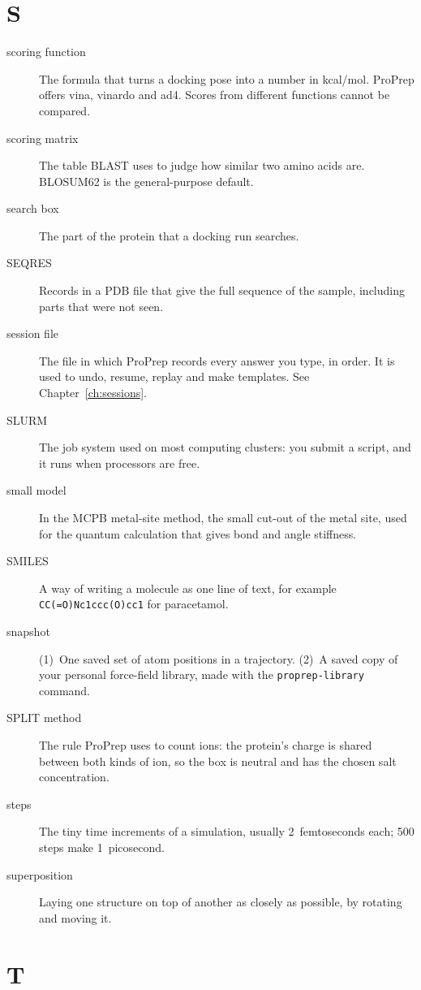 \section*{S}

\begin{description}
\item[scoring function] The formula that turns a docking pose into a number in
  kcal/mol. ProPrep offers vina, vinardo and ad4. Scores from different
  functions cannot be compared.
\item[scoring matrix] The table BLAST uses to judge how similar two amino
  acids are. BLOSUM62 is the general-purpose default.
\item[search box] The part of the protein that a docking run searches.
\item[SEQRES] Records in a PDB file that give the full sequence of the sample,
  including parts that were not seen.
\item[session file] The file  in
  which ProPrep records every answer you type, in order. It is used to undo,
  resume, replay and make templates. See Chapter~\ref{ch:sessions}.
\item[SLURM] The job system used on most computing clusters: you submit a
  script, and it runs when processors are free.
\item[small model] In the MCPB metal-site method, the small cut-out of the
  metal site, used for the quantum calculation that gives bond and angle
  stiffness.
\item[SMILES] A way of writing a molecule as one line of text, for example
  \texttt{CC(=O)Nc1ccc(O)cc1} for paracetamol.
\item[snapshot] (1)~One saved set of atom positions in a trajectory. (2)~A
  saved copy of your personal force-field library, made with the
  \texttt{proprep-library} command.
\item[SPLIT method] The rule ProPrep uses to count ions: the protein's charge
  is shared between both kinds of ion, so the box is neutral and has the
  chosen salt concentration.
\item[steps] The tiny time increments of a simulation, usually 2~femtoseconds
  each; 500 steps make 1~picosecond.
\item[superposition] Laying one structure on top of another as closely as
  possible, by rotating and moving it.
\end{description}

\section*{T}


